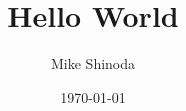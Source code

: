 \documentclass[UTF8,a4paper,twoside,12pt]{article}
\begin{document}
\title{Hello World}
\author{Mike Shinoda}
\date{\today}

\maketitle

\newpage

\tableofcontents

\newpage


\end{document}
